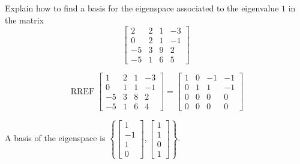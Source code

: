 
\begin{exerciseStatement}


Explain how to find a basis for the eigenspace associated to the eigenvalue \( 1 \) in the matrix \[ \left[\begin{array}{cccc}
2 & 2 & 1 & -3 \\
0 & 2 & 1 & -1 \\
-5 & 3 & 9 & 2 \\
-5 & 1 & 6 & 5
\end{array}\right] \]


\end{exerciseStatement}
    
\begin{exerciseAnswer} 


\[\operatorname{RREF} \left[\begin{array}{cccc}
1 & 2 & 1 & -3 \\
0 & 1 & 1 & -1 \\
-5 & 3 & 8 & 2 \\
-5 & 1 & 6 & 4
\end{array}\right] = \left[\begin{array}{cccc}
1 & 0 & -1 & -1 \\
0 & 1 & 1 & -1 \\
0 & 0 & 0 & 0 \\
0 & 0 & 0 & 0
\end{array}\right] \]



A basis of the eigenspace is \( \left\{ \left[\begin{array}{c}
1 \\
-1 \\
1 \\
0
\end{array}\right] , \left[\begin{array}{c}
1 \\
1 \\
0 \\
1
\end{array}\right] \right\} \).


\end{exerciseAnswer}
    
